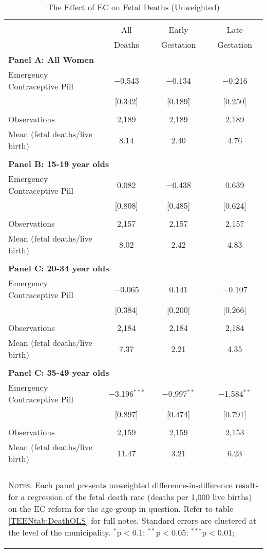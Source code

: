 \begin{table}[htpb!] \centering
\caption{The Effect of EC on Fetal Deaths (Unweighted) }
\label{TEENtab:DeathOLSunweight}
\begin{tabular}{@{\extracolsep{5pt}}lccc}\\[-1.8ex]
\hline\hline\\[-1.8ex]
& All    & Early     & Late      \\
& Deaths & Gestation & Gestation \\ \midrule
\multicolumn{4}{l}{\noindent \textbf{
Panel A: All Women}} \\
Emergency Contraceptive Pill &$-$0.543&$-$0.134&$-$0.216\\
&[0.342]&[0.189]&[0.250]\\
& & & \\
Observations&2,189&2,189&2,189\\
Mean (fetal deaths/live birth)&8.14&2.40&4.76\\
&&&\\
\multicolumn{4}{l}{\noindent \textbf{
Panel B: 15-19 year olds}} \\
Emergency Contraceptive Pill &0.082&$-$0.438&0.639\\
&[0.808]&[0.485]&[0.624]\\
& & & \\
Observations&2,157&2,157&2,157\\
Mean (fetal deaths/live birth)&8.02&2.42&4.83\\
&&&\\
\multicolumn{4}{l}{\noindent \textbf{
Panel C: 20-34 year olds}} \\
Emergency Contraceptive Pill &$-$0.065&0.141&$-$0.107\\
&[0.384]&[0.200]&[0.266]\\
& & & \\
Observations&2,184&2,184&2,184\\
Mean (fetal deaths/live birth)&7.37&2.21&4.35\\
&&&\\
\multicolumn{4}{l}{\noindent \textbf{
Panel C: 35-49 year olds}} \\
Emergency Contraceptive Pill &$-$3.196$^{***}$&$-$0.997$^{**}$&$-$1.584$^{**}$\\
&[0.897]&[0.474]&[0.791]\\
& & & \\
Observations&2,159&2,159&2,153\\
Mean (fetal deaths/live birth)&11.47&3.21&6.23\\
\hline \hline \\[-1.8ex]
\multicolumn{4}{p{11.4cm}}{\begin{footnotesize}          
\textsc{Notes:} Each panel presents unweighted          
difference-in-difference results for a regression of the 
fetal death rate (deaths per 1,000 live births) on the EC
reform for the age group in question. Refer to table     
\ref{TEENtab:DeathOLS} for full notes.  Standard errors 
are clustered at the level of the municipality.          
$^{*}$p$<$0.1; $^{**}$p$<$0.05; $^{***}$p$<$0.01;\end{footnotesize}}
\normalsize\end{tabular}\end{table}
